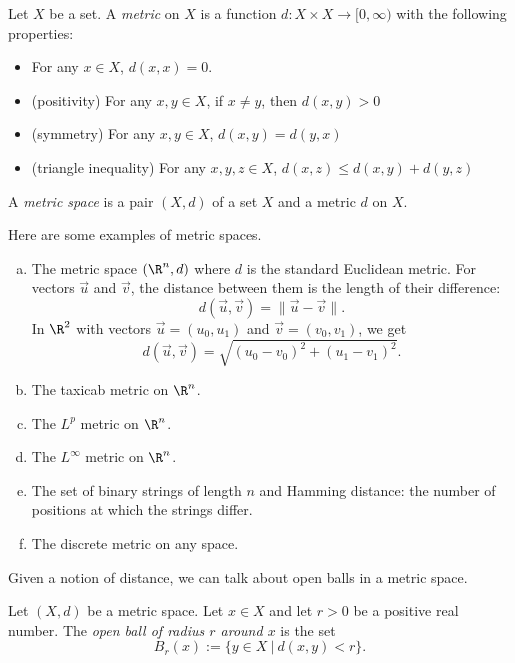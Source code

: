 \documentclass[noname]{notes}
\begin{document}
\begin{definition}
	Let $X$ be a set. A \emph{metric} on $X$ is a function $d \colon X \times X \to [0,\infty)$ with the following properties: 
	\begin{itemize}
		\item For any $x \in X$, $d(x,x) = 0$. 
		\item (positivity) For any $x,y \in X$, if $x \neq y$, then $d(x,y) > 0$
		\item (symmetry) For any $x,y \in X$, $d(x,y) = d(y,x)$
		\item (triangle inequality) For any $x,y,z \in X$, $d(x,z) \leq d(x,y) + d(y,z)$
	\end{itemize}
\end{definition}

\begin{definition}
	A \emph{metric space} is a pair $(X,d)$ of a set $X$ and a metric $d$ on $X$. 
\end{definition}

\begin{example}
	Here are some examples of metric spaces. 
	\begin{enumerate}[(a)]
		\item The metric space $(\R^n, d)$ where $d$ is the standard Euclidean metric. For vectors $\vec u$ and $\vec v$, the distance between them is the length of their difference: 
		\[
			d(\vec u, \vec v) = \|\vec u - \vec v\|. 
		\]
		In $\R^2$ with vectors $\vec u = (u_0, u_1)$ and $\vec v = (v_0, v_1)$, we get 
		\[
			d(\vec u, \vec v) = \sqrt{(u_0 - v_0)^2 + (u_1 - v_1)^2}.
		\]
		\item The taxicab metric on $\R^n$. 
		\item The $L^p$ metric on $\R^n$. 
		\item The $L^\infty$ metric on $\R^n$. 
		\item The set of binary strings of length $n$ and Hamming distance: the number of positions at which the strings differ. 
		\item The discrete metric on any space. 
	\end{enumerate}
\end{example}

Given a notion of distance, we can talk about open balls in a metric space. 

\begin{definition}
	Let $(X,d)$ be a metric space. Let $x \in X$ and let $r > 0$ be a positive real number. The \emph{open ball of radius $r$ around $x$} is the set 
	\[
		B_r(x) := \Big\{ y \in X\ \Big\vert\ d(x,y) < r \Big\}.
	\]
\end{definition}
\end{document}
